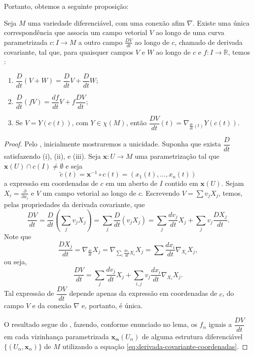 Portanto, obtemos a seguinte proposição:
\begin{proposition}
	\label{prop:derivada-covariante}
	Seja $M$ uma variedade diferenciável, com uma conexão afim $\nabla$. Existe uma única correspondência que associa um campo vetorial $V$ ao longo de uma curva parametrizada $c:I\to M$ a outro campo $\frac{DV}{dt}$ ao longo de $c$, chamado de derivada covariante, tal que, para quaisquer campos $V$ e $W$ ao longo de $c$ e $f:I\to \mathbb{R}$, temos :
	\begin{enumerate}[label=(\roman*)]
		\item $\dfrac{D}{dt}(V+W)= \dfrac{D}{dt}V +\dfrac{D}{dt}W$;
		\item $\dfrac{D}{dt}(fV)=\dfrac{df}{dt}V+f\dfrac{DV}{dt}$;
		\item Se $V = Y(c(t))$, com $Y \in \chi(M)$, então $\dfrac{DV}{dt}(t)=\nabla_{\frac{dc}{dt}(t)}Y(c(t))$.
	\end{enumerate}
	\begin{proof}

		Pelo , inicialmente mostraremos a unicidade.
		Suponha que exista $\dfrac{D}{dt}$ satisfazendo (i), (ii), e (iii). Seja $\mathbf{x}:U\to M$ uma parametrização tal que $\mathbf{x}(U)\cap c(I)\neq \emptyset$ e seja
		\begin{equation*}
			\tilde{c}(t)=\mathbf{x}^{-1} \circ c(t)=(x_{1}(t), \dots, x_{n}(t))
		\end{equation*}
		a expressão em coordenadas de $c$ em um aberto de $I$ contido em $\mathbf{x}(U)$.
		Sejam $X_{i}=\frac{\partial}{\partial x_{i}}$ e $V$ um campo vetorial ao longo de $c$.
		Escrevendo $V=\sum v_{j}X_{j}$, temos, pelas propriedades da derivada covariante, que
		\begin{equation*}
			\frac{DV}{dt}=\frac{D}{dt}\left( \sum_{j}v_{j}X_{j} \right)=\sum_{j}\frac{D}{dt}(v_{j}X_{j})=\sum_{j}\frac{dv_{j}}{dt}X_{j}+ \sum_{j}v_{j}\frac{DX_{j}}{dt}.
		\end{equation*}
		Note que
		\begin{equation*}
			\frac{DX_{j}}{dt}=\nabla_{\frac{dc}{dt}}X_{j}=\nabla_{\sum_{i}\frac{dx_{i}}{dt}X_{i}}X_{j}=\sum\frac{dx_{i}}{dt}\nabla_{X_{i}}X_{j},
		\end{equation*}
		ou seja,
		\begin{equation}
			\label{eq:derivada-covariante-coordenadas}
			\frac{DV}{dt}=\sum_{j}\frac{dv_{j}}{dt}X_{j}+\sum_{i,j}v_{j}\frac{dx_{i}}{dt}\nabla_{X_{i}}X_{j}.
		\end{equation}
		Tal expressão de $\dfrac{DV}{dt}$ depende apenas da expressão em coordenadas de $c$, do campo $V$ e da conexão $\nabla$ e, portanto, é única.

		O resultado segue do , fazendo, conforme enunciado no lema, os $f_{\alpha}$ iguais a $\dfrac{DV}{dt}$ em cada vizinhança parametrizada $\mathbf{x_{\alpha}}(U_{\alpha})$ de alguma estrutura diferenciável $\{ (U_{\alpha},\mathbf{x}_{\alpha}) \}$ de $M$ utilizando a equação \eqref{eq:derivada-covariante-coordenadas}.
	\end{proof}
\end{proposition}
